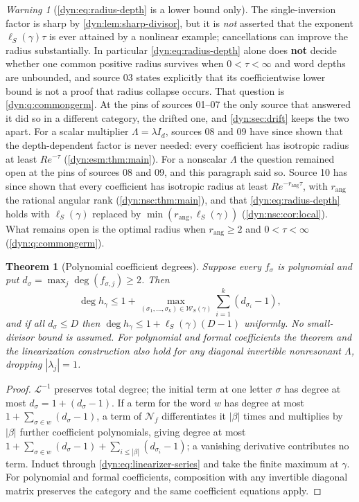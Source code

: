 \documentclass[11pt,letterpaper]{article}
\newtheorem{theorem}{Theorem}[section]
\theoremstyle{definition}
\theoremstyle{remark}
\newtheorem{warning}[warning]{Warning}
\newcommand{\word}{\mathcal W}
\newcommand{\Li}{\mathcal L}
\newcommand{\NN}{\mathcal N}
\newcommand{\rang}{r_{\mathrm{ang}}}
\numberwithin{equation}{section}
\begin{document}
\begin{warning}[\eqref{dyn:eq:radius-depth} is a lower bound only]
\label{dyn:warn:lowerbound}
The single-inversion factor is sharp by \cref{dyn:lem:sharp-divisor}, but
it is \emph{not} asserted that the exponent $\ell_S(\gamma)\tau$ is ever
attained by a nonlinear example; cancellations can improve the radius
substantially. In particular \eqref{dyn:eq:radius-depth} alone does
\textbf{not} decide whether one common positive radius survives when
$0<\tau<\infty$ and word depths are unbounded, and source 03 states
explicitly that its coefficientwise lower bound is not a proof that radius
collapse occurs. That question is \cref{dyn:q:commongerm}. At the pins of
sources 01--07 the only source that answered it did so in a different
category, the drifted one, and \cref{dyn:sec:drift} keeps the two apart.
For a scalar multiplier $\Lambda=\lambda I_d$, sources 08 and 09 have since
shown that the depth-dependent factor is never needed: every coefficient has
isotropic radius at least $Re^{-\tau}$ (\cref{dyn:esm:thm:main}). For a
nonscalar $\Lambda$ the question remained open at the pins of sources 08
and 09, and this paragraph said so. Source 10 has since shown that every
coefficient has isotropic radius at least $Re^{-\rang\tau}$, with $\rang$
the rational angular rank (\cref{dyn:nsc:thm:main}), and that
\eqref{dyn:eq:radius-depth} holds with $\ell_S(\gamma)$ replaced by
$\min(\rang,\ell_S(\gamma))$ (\cref{dyn:nsc:cor:local}). What remains open
is the optimal radius when $\rang\ge2$ and $0<\tau<\infty$ (\cref{dyn:q:commongerm}).
\end{warning}

\begin{theorem}[Polynomial coefficient degrees]\label{dyn:thm:degrees}
Suppose every $f_\sigma$ is polynomial and put
$d_\sigma=\max_j\deg(f_{\sigma,j})\ge2$. Then
\begin{equation}\label{dyn:eq:degree-bound}
 \deg h_\gamma\le 1+\max_{(\sigma_1,\dots,\sigma_k)\in\word_S(\gamma)}
 \sum_{i=1}^{k}(d_{\sigma_i}-1),
\end{equation}
and if all $d_\sigma\le D$ then
$\deg h_\gamma\le 1+\ell_S(\gamma)(D-1)$ uniformly. No small-divisor bound
is assumed. For polynomial and formal coefficients the theorem and the
linearization construction also hold for any diagonal invertible
nonresonant $\Lambda$, \emph{dropping} $|\lambda_j|=1$.
\end{theorem}
\begin{proof}
$\Li^{-1}$ preserves total degree; the initial term at one letter $\sigma$
has degree at most $d_\sigma=1+(d_\sigma-1)$. If a term for the word $w$
has degree at most $1+\sum_{\sigma\in w}(d_\sigma-1)$, a term of $\NN_f$
differentiates it $|\beta|$ times and multiplies by $|\beta|$ further
coefficient polynomials, giving degree at most
$1+\sum_{\sigma\in w}(d_\sigma-1)+\sum_{i\le|\beta|}(d_{\sigma_i}-1)$; a
vanishing derivative contributes no term. Induct through
\eqref{dyn:eq:linearizer-series} and take the finite maximum at $\gamma$.
For polynomial and formal coefficients, composition with any invertible
diagonal matrix preserves the category and the same coefficient equations
apply.
\end{proof}
\end{document}
